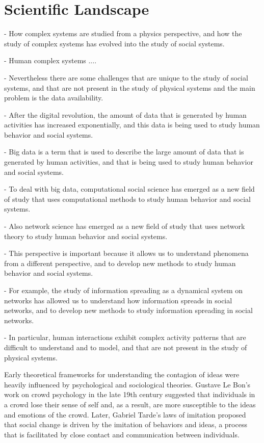 \setcounter{page}{1}

\section{\label{sec:scie_lands} Scientific Landscape}

- How complex systems are studied from a physics perspective, and how the study of complex systems has evolved into the study of social systems.

- Human complex systems ....

- Nevertheless there are some challenges that are unique to the study of social systems, and that are not present in the study of physical systems and the main problem is the data availability.

- After the digital revolution, the amount of data that is generated by human activities has increased exponentially, and this data is being used to study human behavior and social systems. 

- Big data is a term that is used to describe the large amount of data that is generated by human activities, and that is being used to study human behavior and social systems.

- To deal with big data, computational social science has emerged as a new field of study that uses computational methods to study human behavior and social systems.

- Also network science has emerged as a new field of study that uses network theory to study human behavior and social systems.

- This perspective is important because it allows us to understand phenomena from a different perspective, and to develop new methods to study human behavior and social systems. 

- For example, the study of information spreading as a dynamical system on networks has allowed us to understand how information spreads in social networks, and to develop new methods to study information spreading in social networks.

- In particular, human interactions exhibit complex activity patterns that are difficult to understand and to model, and that are not present in the study of physical systems.

Early theoretical frameworks for understanding the contagion of ideas were heavily influenced by psychological and sociological theories. Gustave Le Bon's work on crowd psychology in the late 19th century suggested that individuals in a crowd lose their sense of self and, as a result, are more susceptible to the ideas and emotions of the crowd. Later, Gabriel Tarde's laws of imitation proposed that social change is driven by the imitation of behaviors and ideas, a process that is facilitated by close contact and communication between individuals.


